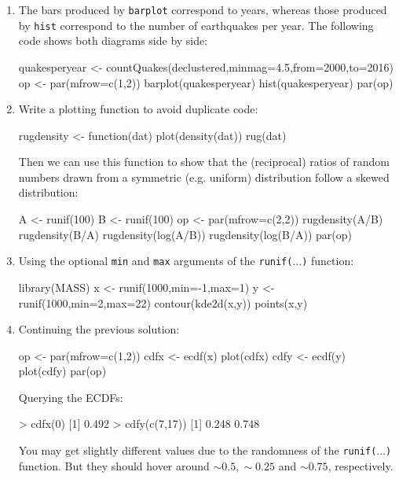 \begin{enumerate}

\item The bars produced by \texttt{barplot} correspond to years,
  whereas those produced by \texttt{hist} correspond to the number of
  earthquakes per year. The following code shows both diagrams side by
  side:
  
\begin{script}
quakesperyear <- countQuakes(declustered,minmag=4.5,from=2000,to=2016)
op <- par(mfrow=c(1,2))
barplot(quakesperyear)
hist(quakesperyear)
par(op)
\end{script}

\item\label{it:ABsol} Write a plotting function to avoid duplicate
  code:

\begin{script}
rugdensity <- function(dat){
  plot(density(dat))
  rug(dat)
}
\end{script}

Then we can use this function to show that the (reciprocal) ratios of
random numbers drawn from a symmetric (e.g. uniform) distribution
follow a skewed distribution:

\begin{script}[firstnumber=5]
A <- runif(100)
B <- runif(100)
op <- par(mfrow=c(2,2))
rugdensity(A/B)
rugdensity(B/A)
rugdensity(log(A/B))
rugdensity(log(B/A))
par(op)
\end{script}

\item\label{it:xyrandsol} Using the optional \texttt{min} and
  \texttt{max} arguments of the \texttt{runif($\ldots$)} function:

\begin{script}
library(MASS)
x <- runif(1000,min=-1,max=1)
y <- runif(1000,min=2,max=22)
contour(kde2d(x,y))
points(x,y)
\end{script}

\item Continuing the previous solution:

\begin{script}[firstnumber=6]
op <- par(mfrow=c(1,2))
cdfx <- ecdf(x)
plot(cdfx)
cdfy <- ecdf(y)
plot(cdfy)
par(op)
\end{script}

Querying the ECDFs:

\begin{console}
> cdfx(0)
[1] 0.492
> cdfy(c(7,17))
[1] 0.248 0.748
\end{console}

You may get slightly different values due to the randomness of the
\texttt{runif($\ldots$)} function. But they should hover around
$\sim{0.5}, \sim{0.25}$ and $\sim{0.75}$, respectively.

\end{enumerate}
  
